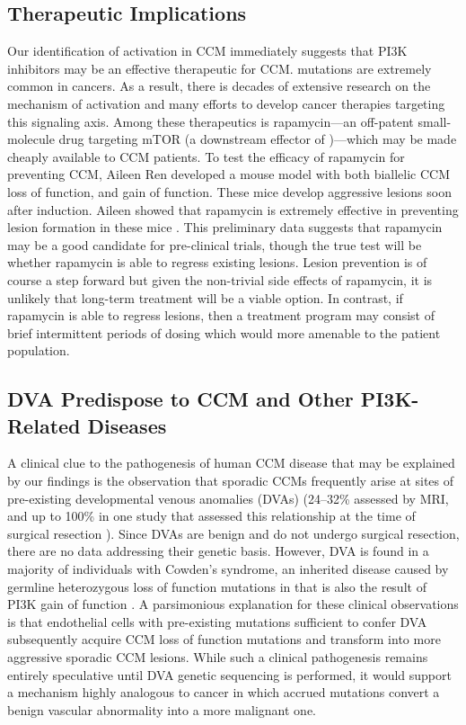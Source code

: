 \subsection{Therapeutic Implications}
Our identification of  activation in CCM immediately suggests that PI3K inhibitors may be an effective therapeutic for CCM.  mutations are extremely common in cancers. As a result, there is decades of extensive research on the mechanism of  activation and many efforts to develop cancer therapies targeting this signaling axis. Among these therapeutics is rapamycin---an off-patent small-molecule drug targeting mTOR (a downstream effector of )---which may be made cheaply available to CCM patients. To test the efficacy of rapamycin for preventing CCM, Aileen Ren developed a mouse model with both biallelic CCM loss of function, and  gain of function. These mice develop aggressive lesions soon after induction. Aileen showed that rapamycin is extremely effective in preventing lesion formation in these mice \citep{ren2021}. This preliminary data suggests that rapamycin may be a good candidate for pre-clinical trials, though the true test will be whether rapamycin is able to regress existing lesions. Lesion prevention is of course a step forward but given the non-trivial side effects of rapamycin, it is unlikely that long-term treatment will be a viable option. In contrast, if rapamycin is able to regress lesions, then a treatment program may consist of brief intermittent periods of dosing which would more amenable to the patient population. 

\subsection{DVA Predispose to CCM and Other PI3K-Related Diseases}
A clinical clue to the pathogenesis of human CCM disease that may be explained by our findings is the observation that sporadic CCMs frequently arise at sites of pre-existing developmental venous anomalies (DVAs) (24--32\% assessed by MRI, and up to 100\% in one study that assessed this relationship at the time of surgical resection \citep{wurm2005, porter1999, abdulrauf1999}). Since DVAs are benign and do not undergo surgical resection, there are no data addressing their genetic basis.  However, DVA is found in a majority of individuals with Cowden’s syndrome, an inherited disease caused by germline heterozygous loss of function mutations in  that is also the result of PI3K gain of function \citep{dhamija2018, tan2007}.  A parsimonious explanation for these clinical observations is that endothelial cells with pre-existing  mutations sufficient to confer DVA subsequently acquire CCM loss of function mutations and transform into more aggressive sporadic CCM lesions.  While such a clinical pathogenesis remains entirely speculative until DVA genetic sequencing is performed, it would support a mechanism highly analogous to cancer in which accrued mutations convert a benign vascular abnormality into a more malignant one. 

